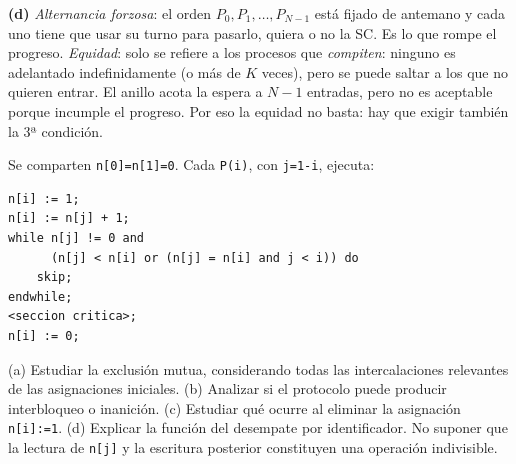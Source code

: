 \documentclass[11pt,a4paper,oneside]{report}
\begin{document}
\begin{solucion}
\textbf{(d)} \emph{Alternancia forzosa}: el orden $P_0, P_1, \dots, P_{N-1}$ está fijado de antemano y cada uno tiene
que usar su turno para pasarlo, quiera o no la SC. Es lo que rompe el progreso. \emph{Equidad}: solo se refiere a
los procesos que \emph{compiten}: ninguno es adelantado indefinidamente (o más de $K$ veces), pero se puede saltar a
los que no quieren entrar. El anillo acota la espera a $N-1$ entradas, pero no es aceptable porque incumple el
progreso. Por eso la equidad no basta: hay que exigir también la 3ª condición.
\end{solucion}

\begin{ejercicio}
Se comparten \texttt{n[0]=n[1]=0}. Cada \texttt{P(i)}, con \texttt{j=1-i}, ejecuta:
\begin{lstlisting}
n[i] := 1;
n[i] := n[j] + 1;
while n[j] != 0 and
      (n[j] < n[i] or (n[j] = n[i] and j < i)) do
    skip;
endwhile;
<seccion critica>;
n[i] := 0;
\end{lstlisting}
(a) Estudiar la exclusión mutua, considerando todas las intercalaciones relevantes de las asignaciones iniciales.
(b) Analizar si el protocolo puede producir interbloqueo o inanición. (c) Estudiar qué ocurre al eliminar la
asignación \texttt{n[i]:=1}. (d) Explicar la función del desempate por identificador. No suponer que la lectura de
\texttt{n[j]} y la escritura posterior constituyen una operación indivisible.
\end{ejercicio}
\end{document}
